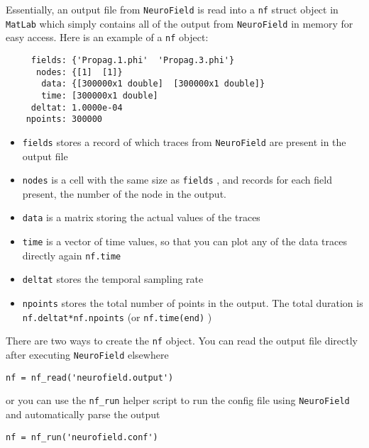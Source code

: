 \documentclass[12pt,a4paper]{article}
\newcommand{\type}[1]{ {\small\small\tt #1} }
\newcommand{\NF}[0]{ \type{NeuroField}}
\begin{document}
Essentially, an output file from \NF is read into a \type{nf} struct object in \type{MatLab} which simply contains all of the output from \NF in memory for easy access. Here is an example of a \type{nf} object:
\begin{lstlisting}
     fields: {'Propag.1.phi'  'Propag.3.phi'}
      nodes: {[1]  [1]}
       data: {[300000x1 double]  [300000x1 double]}
       time: [300000x1 double]
     deltat: 1.0000e-04
    npoints: 300000
\end{lstlisting}
\begin{itemize}
\item \type{fields} stores a record of which traces from \NF are present in the output file
\item \type{nodes} is a cell with the same size as \type{fields}, and records for each field present, the number of the node in the output. 
\item \type{data} is a matrix storing the actual values of the traces
\item \type{time} is a vector of time values, so that you can plot any of the data traces directly again \type{nf.time}
\item \type{deltat} stores the temporal sampling rate
\item \type{npoints} stores the total number of points in the output. The total duration is \type{nf.deltat*nf.npoints} (or  \type{nf.time(end)})
\end{itemize}

There are two ways to create the \type{nf} object. You can read the output file directly after executing \NF elsewhere

\begin{lstlisting}
nf = nf_read('neurofield.output')
\end{lstlisting}

or you can use the \type{nf\_run} helper script to run the config file using \NF and automatically parse the output

\begin{lstlisting}
nf = nf_run('neurofield.conf')
\end{lstlisting}

\end{document}
